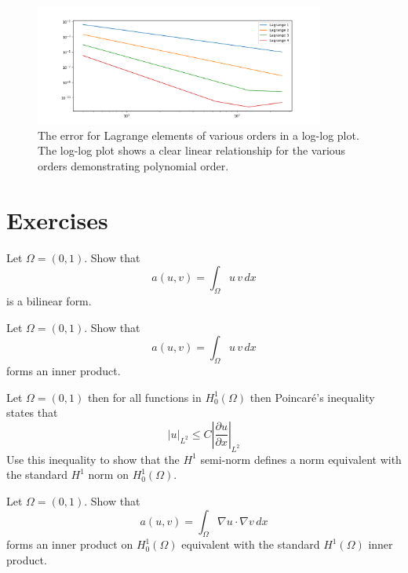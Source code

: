 \begin{figure}
\begin{center}
\includegraphics[width=0.85\textwidth]{chapters/elliptic2/plots/poisson1d.png}
\caption{The error for Lagrange elements of various orders in a log-log plot.  
The log-log plot shows a clear linear relationship for the various orders demonstrating polynomial order.   
}
\label{fig:poisson1D:rates}
\end{center}
\end{figure}



\section{Exercises}

\begin{exercise}
\label{ex:bilinear}
Let $\Omega=(0,1)$.  
Show that 
\[  
a(u, v) = \int_\Omega  u \, v \, dx 
\]
is a bilinear form. 
\end{exercise}

\begin{exercise}
\label{ex:inner}
Let $\Omega=(0,1)$.  
Show that 
\[  
a(u, v) = \int_\Omega  u \, v \, dx 
\]
forms an inner product.  
\end{exercise}




\begin{exercise}
\label{ex:poincare}

Let $\Omega=(0,1)$ then  
for all functions in $H^1_0(\Omega)$ then
Poincar\'e's inequality states that
\[
|u|_{L^2} \le C  |\frac{\partial u}{\partial x}|_{L^2}   
\]
Use this inequality to show that the $H^1$ semi-norm defines 
a norm equivalent with the standard $H^1$ norm on $H^1_0(\Omega)$.  
\end{exercise}



\begin{exercise}
\label{ex:poincare2}

Let $\Omega=(0,1)$.  
Show that 
\[  
a(u, v) = \int_\Omega \nabla u \cdot \nabla v \, dx 
\]
forms an inner product on $H^1_0(\Omega)$  equivalent with the standard
$H^1(\Omega)$ inner product. 
\end{exercise}

